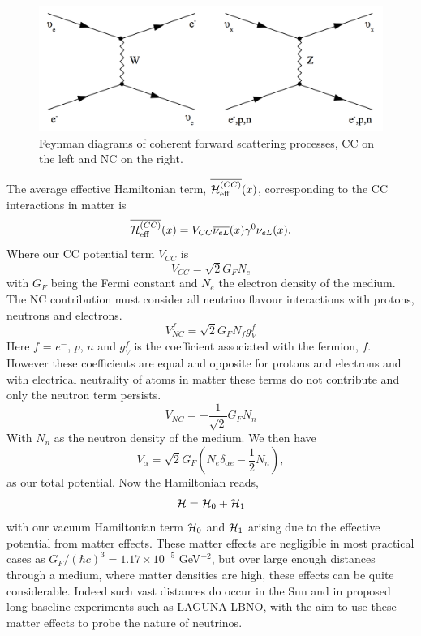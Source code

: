 \begin{figure}[htbp]
\begin{center}
\includegraphics[width=140mm]{Introduction/IntroductionFigs/feynmanDiagramsMatterEffectsCCandNC.png}
\caption{Feynman diagrams of coherent forward scattering processes, CC on the left and NC on the right.}
\label{fig:CCAndNCFeynamnMatterEffects}
\end{center}
\end{figure}

The average effective Hamiltonian term, $\overline{{\cal H}^{(CC)}_{\textrm{eff}}}(x)$, corresponding to the CC interactions in matter is
\begin{equation}
\overline{{\cal H}^{(CC)}_{\textrm{eff}}}(x) = V_{CC}\overline{\nu_{eL}}(x)\gamma^{0}\nu_{eL}(x).
\end{equation}
Where our CC potential term $V_{CC}$ is
\begin{equation}
V_{CC} = \sqrt{2}G_{F}N_{e}
\end{equation}
with $G_{F}$ being the Fermi constant and $N_{e}$ the electron density of the medium.
The NC contribution must consider all neutrino flavour interactions with protons, neutrons and electrons.
\begin{equation}
V_{NC}^{f}= \sqrt{2}G_{F}N_{f}g_{V}^{f}
\end{equation}
Here $f$ = $e^{-}$, $p$, $n$ and $g_{V}^{f}$ is the coefficient associated with the fermion, $f$. However these coefficients are equal and opposite for protons and electrons and with electrical neutrality of atoms in matter these terms do not contribute and only the neutron term persists.
\begin{equation}
V_{NC}= -\frac{1}{\sqrt{2}}G_{F}N_{n}
\end{equation}
With $N_{n}$ as the neutron density of the medium. We then have
\begin{equation}
V_{\alpha} = \sqrt{2}G_{F}\left(N_{e}\delta_{\alpha e} - \frac{1}{2}N_{n}\right),
\end{equation}
as our total potential. Now the Hamiltonian reads, 
\begin{equation}
{\cal H} = {\cal H}_{0} + {\cal H}_{1}
\end{equation}
with our vacuum Hamiltonian term ${\cal H}_{0}$ and ${\cal H}_{1}$ arising due to the effective potential from matter effects. These matter effects are negligible in most practical cases as $G_{F} / (\hbar c)^{3} = 1.17 \times 10^{-5} $ GeV$^{-2}$, but over large enough distances through a medium, where matter densities are high, these effects can be quite considerable. Indeed such vast distances do occur in the Sun and in proposed long baseline experiments such as LAGUNA-LBNO, with the aim to use these matter effects to probe the nature of neutrinos. 

